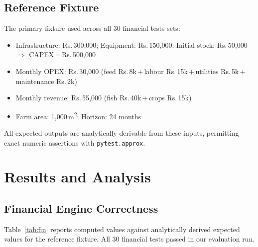\documentclass[runningheads]{llncs}
\newcommand{\inr}[1]{Rs.\,#1}
\begin{document}
\subsection{Reference Fixture}

The primary fixture used across all 30 financial tests sets:
\begin{itemize}
  \item Infrastructure: \inr{300{,}000}; Equipment: \inr{150{,}000};
        Initial stock: \inr{50{,}000}
        $\Rightarrow$ CAPEX\,=\,\inr{500{,}000}
  \item Monthly OPEX: \inr{30{,}000}
        (feed \inr{8k}\,+\,labour \inr{15k}\,+\,utilities
         \inr{5k}\,+\,maintenance \inr{2k})
  \item Monthly revenue: \inr{55{,}000}
        (fish \inr{40k}\,+\,crops \inr{15k})
  \item Farm area: 1{,}000\,m\textsuperscript{2};
        Horizon: 24 months
\end{itemize}

All expected outputs are analytically derivable from these inputs,
permitting exact numeric assertions with \texttt{pytest.approx}.


\section{Results and Analysis}
\label{sec:results}

\subsection{Financial Engine Correctness}

Table~\ref{tab:fin} reports computed values against analytically
derived expected values for the reference fixture. All 30 financial
tests passed in our evaluation run.
\end{document}
